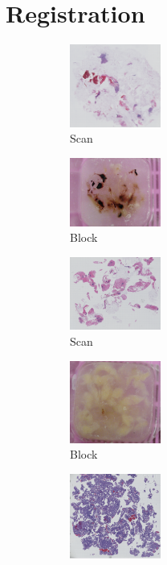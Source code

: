 \documentclass[a4paper,10pt,oneside]{article}
\begin{document}
\section{Registration}
\begin{figure}[hbtp]
	\centering
  \begin{subfigure}[b]{.2\textwidth}
    \includegraphics[width=3cm]{images/PO13-00516A1_1_7_201305171148.png}
    \caption{Scan}
  \end{subfigure}
  \begin{subfigure}[b]{.2\textwidth}
	  \includegraphics[width=3cm]{images/PO1300516_A1.JPG}
    \caption{Block}
  \end{subfigure}
  \begin{subfigure}[b]{.2\textwidth}
	  \includegraphics[width=3cm]{images/PO14-00496A1Level1_1_2_201404181459.png} 
    \caption{Scan}
  \end{subfigure}
  \begin{subfigure}[b]{.2\textwidth}
	  \includegraphics[width=3cm]{images/PO1400496_A1.JPG} 
    \caption{Block}
  \end{subfigure}
  \begin{subfigure}[b]{.2\textwidth}
	  \includegraphics[width=3cm]{images/PO14-00482B3_1_2_201404171123.png} 

\end{subfigure}
\end{figure}
\end{document}
